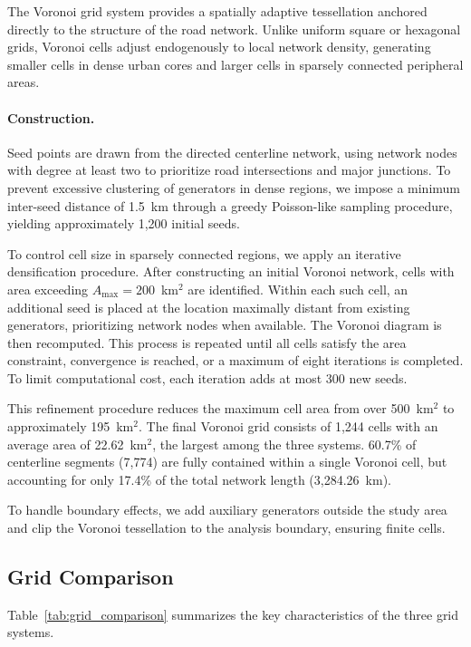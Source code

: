 \documentclass[12pt]{article}
\begin{document}
	The Voronoi grid system provides a spatially adaptive tessellation anchored directly to the structure of the road network. Unlike uniform square or hexagonal grids, Voronoi cells adjust endogenously to local network density, generating smaller cells in dense urban cores and larger cells in sparsely connected peripheral areas.
	
	\paragraph{Construction.}
	Seed points are drawn from the directed centerline network, using network nodes with degree at least two to prioritize road intersections and major junctions. To prevent excessive clustering of generators in dense regions, we impose a minimum inter-seed distance of 1.5~km through a greedy Poisson-like sampling procedure, yielding approximately 1,200 initial seeds.
	
	To control cell size in sparsely connected regions, we apply an iterative densification procedure. After constructing an initial Voronoi network, cells with area exceeding $A_{\max}=200$~km$^2$ are identified. Within each such cell, an additional seed is placed at the location maximally distant from existing generators, prioritizing network nodes when available. The Voronoi diagram is then recomputed. This process is repeated until all cells satisfy the area constraint, convergence is reached, or a maximum of eight iterations is completed. To limit computational cost, each iteration adds at most 300 new seeds.
	
	This refinement procedure reduces the maximum cell area from over 500~km$^2$ to approximately 195~km$^2$. The final Voronoi grid consists of 1,244 cells with an average area of 22.62~km$^2$, the largest among the three systems. 60.7\% of centerline segments (7,774) are fully contained within a single Voronoi cell, but accounting for only 17.4\% of the total network length (3,284.26~km).
	
	To handle boundary effects, we add auxiliary generators outside the study area and clip the Voronoi tessellation to the analysis boundary, ensuring finite cells.

	\subsection{Grid Comparison}
	
	Table~\ref{tab:grid_comparison} summarizes the key characteristics of the three grid systems. 
	
\end{document}
